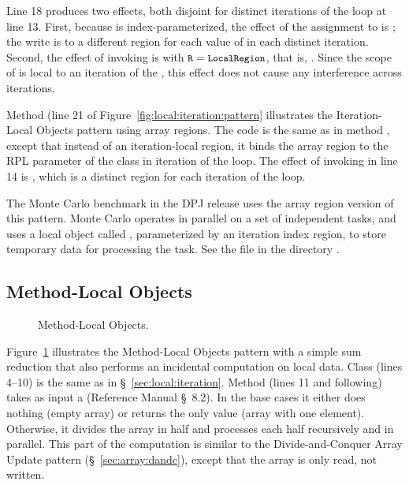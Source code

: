 Line 18 produces two effects, both disjoint for distinct iterations of
the  loop at line 13.  First, because  is
index-parameterized, the effect of the assignment to 
is ; the write is to a different region for each value
of  in each distinct iteration.  Second, the effect of invoking
 is  with $\mbox{\small{\texttt{R}}}=\mbox{\small{\texttt{LocalRegion}}}$,
that is, .  Since the scope of
 is local to an iteration of the , this
effect does not cause any interference across 
iterations.

 Method
 (line 21 of
Figure~\ref{fig:local:iteration:pattern} illustrates the
Iteration-Local Objects pattern using array regions.  The code is the
same as in method , except that instead of an
iteration-local region, it binds the array region \kwd{[i]} to the RPL
parameter of the  class in iteration  of the
 loop.  The effect of invoking  in line
14 is , which is a distinct region for each iteration
of the loop.

 The Monte Carlo benchmark in the DPJ
release uses the array region version of this pattern.  Monte Carlo
operates in parallel on a set of independent tasks, and uses a local
object called , parameterized by an iteration index
region, to store temporary data for processing the task.  See the file
 in the directory
.  


\subsection{Method-Local Objects%
\label{sec:local:method}}

\begin{figure}

\caption{Method-Local Objects.}
\label{fig:local:method:pattern}
\end{figure}

Figure~\ref{fig:local:method:pattern} illustrates the Method-Local
Objects pattern with a simple sum reduction that also performs an
incidental computation on local data.  Class  (lines
4--10) is the same as in \S~\ref{sec:local:iteration}.  Method
 (lines 11 and following) takes as input a
 (Reference Manual \S~8.2).  In the base cases it
either does nothing (empty array) or returns the only value (array
with one element).  Otherwise, it divides the array in half and
processes each half recursively and in parallel.  This part of the
computation is similar to the Divide-and-Conquer Array Update pattern
(\S~\ref{sec:array:dandc}), except that the array is only read, not
written.

